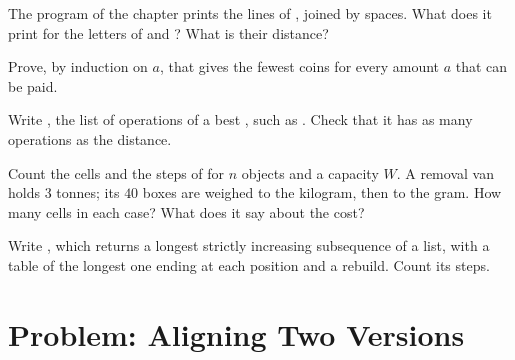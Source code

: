 \begin{exercise}[$\star\star$]\label{exo:g12:dynamic-programming:11}
The program of the chapter prints the lines of , joined by spaces. What does it print for the letters of
 and ? What is their distance?
\end{exercise}

\begin{exercise}[$\star\star\star$]\label{exo:g12:dynamic-programming:12}
Prove, by induction on $a$, that  gives the fewest coins for every amount $a$ that can be paid.
\end{exercise}

\begin{exercise}[$\star\star\star$]\label{exo:g12:dynamic-programming:13}
Write , the list of operations of a best , such as .
Check that it has as many operations as the distance.
\end{exercise}

\begin{exercise}[$\star\star\star$]\label{exo:g12:dynamic-programming:14}
Count the cells and the steps of  for $n$ objects and a capacity $W$. A removal van holds $3$ tonnes;
its $40$ boxes are weighed to the kilogram, then to the gram. How many cells in each case? What does it say about the
cost?
\end{exercise}

\begin{exercise}[$\star\star\star$]\label{exo:g12:dynamic-programming:15}
Write , which returns a longest strictly increasing subsequence of a list, with a table
of the longest one ending at each position and a rebuild. Count its steps.
\end{exercise}

\section{Problem: Aligning Two Versions}\label{sec:g12:dynamic-programming:problem}


